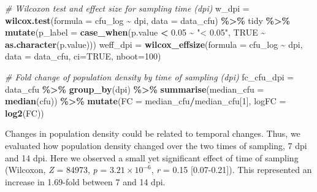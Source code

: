 \documentclass[
]{article}
\newenvironment{Shaded}{\begin{snugshade}}{\end{snugshade}}
\newcommand{\AttributeTok}[1]{\textcolor[rgb]{0.13,0.29,0.53}{#1}}
\newcommand{\CommentTok}[1]{\textcolor[rgb]{0.56,0.35,0.01}{\textit{#1}}}
\newcommand{\ConstantTok}[1]{\textcolor[rgb]{0.56,0.35,0.01}{#1}}
\newcommand{\DecValTok}[1]{\textcolor[rgb]{0.00,0.00,0.81}{#1}}
\newcommand{\FloatTok}[1]{\textcolor[rgb]{0.00,0.00,0.81}{#1}}
\newcommand{\FunctionTok}[1]{\textcolor[rgb]{0.13,0.29,0.53}{\textbf{#1}}}
\newcommand{\NormalTok}[1]{#1}
\newcommand{\OtherTok}[1]{\textcolor[rgb]{0.56,0.35,0.01}{#1}}
\newcommand{\SpecialCharTok}[1]{\textcolor[rgb]{0.81,0.36,0.00}{\textbf{#1}}}
\newcommand{\StringTok}[1]{\textcolor[rgb]{0.31,0.60,0.02}{#1}}
\begin{document}
\begin{Shaded}
\begin{Highlighting}[]
\CommentTok{\# Wilcoxon test and effect size for sampling time (dpi)}
\NormalTok{w\_dpi }\OtherTok{=} \FunctionTok{wilcox.test}\NormalTok{(}\AttributeTok{formula =}\NormalTok{ cfu\_log }\SpecialCharTok{\textasciitilde{}}\NormalTok{ dpi, }\AttributeTok{data =}\NormalTok{ data\_cfu) }\SpecialCharTok{\%\textgreater{}\%}\NormalTok{ tidy }\SpecialCharTok{\%\textgreater{}\%} 
    \FunctionTok{mutate}\NormalTok{(}\AttributeTok{p\_label =} \FunctionTok{case\_when}\NormalTok{(p.value }\SpecialCharTok{\textless{}} \FloatTok{0.05} \SpecialCharTok{\textasciitilde{}} \StringTok{"\textless{} 0.05"}\NormalTok{, }\ConstantTok{TRUE} \SpecialCharTok{\textasciitilde{}} \FunctionTok{as.character}\NormalTok{(p.value)))}
\NormalTok{weff\_dpi }\OtherTok{=} \FunctionTok{wilcox\_effsize}\NormalTok{(}\AttributeTok{formula =}\NormalTok{ cfu\_log }\SpecialCharTok{\textasciitilde{}}\NormalTok{ dpi, }\AttributeTok{data =}\NormalTok{ data\_cfu, }\AttributeTok{ci=}\ConstantTok{TRUE}\NormalTok{, }\AttributeTok{nboot=}\DecValTok{100}\NormalTok{)}

\CommentTok{\# Fold change of population density by time of sampling (dpi)}
\NormalTok{fc\_cfu\_dpi }\OtherTok{=}\NormalTok{ data\_cfu }\SpecialCharTok{\%\textgreater{}\%} 
    \FunctionTok{group\_by}\NormalTok{(dpi) }\SpecialCharTok{\%\textgreater{}\%} 
    \FunctionTok{summarise}\NormalTok{(}\AttributeTok{median\_cfu =} \FunctionTok{median}\NormalTok{(cfu)) }\SpecialCharTok{\%\textgreater{}\%} 
    \FunctionTok{mutate}\NormalTok{(}\AttributeTok{FC =}\NormalTok{ median\_cfu}\SpecialCharTok{/}\NormalTok{median\_cfu[}\DecValTok{1}\NormalTok{],}
           \AttributeTok{logFC =} \FunctionTok{log2}\NormalTok{(FC))}
\end{Highlighting}
\end{Shaded}

Changes in population density could be related to temporal changes.
Thus, we evaluated how population density changed over the two times of
sampling, 7 dpi and 14 dpi. Here we observed a small yet significant
effect of time of sampling (Wilcoxon, \emph{Z} = 84973, \emph{p} =
\ensuremath{3.21\times 10^{-6}}, \emph{r} = 0.15 {[}0.07-0.21{]}). This
represented an increase in 1.69-fold between 7 and 14 dpi.
\end{document}

